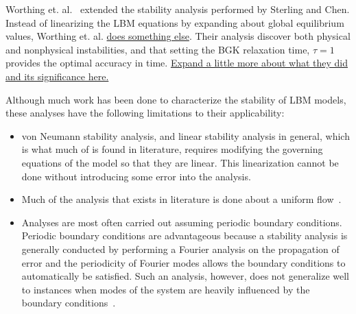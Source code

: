 \documentclass{article}
\begin{document}
Worthing et. al.~\cite{worthing1997stability} extended the stability analysis performed by Sterling and Chen.
Instead of linearizing the LBM equations by expanding about global equilibrium values, Worthing et. al. \ul{does something else}.
Their analysis discover both physical and nonphysical instabilities, and that setting the BGK relaxation time, $\tau = 1$ provides the optimal accuracy in time. %
\ul{Expand a little more about what they did and its significance here.}

Although much work has been done to characterize the stability of LBM models, these analyses have the following limitations to their applicability:

\begin{itemize}
	\item von Neumann stability analysis, and linear stability analysis in general, which is what much of is found in literature, requires modifying the governing equations of the model so that they are linear. %
	This linearization cannot be done without introducing some error into the analysis. %
	\item Much of the analysis that exists in literature is done about a uniform flow~\cite{worthing1997stability,niu2004investigation}. %
	\item Analyses are most often carried out assuming periodic boundary conditions.
	Periodic boundary conditions are advantageous because a stability analysis is generally conducted by performing a Fourier analysis on the propagation of error and the periodicity of Fourier modes allows the boundary conditions to automatically be satisfied.
	Such an analysis, however, does not generalize well to instances when modes of the system are heavily influenced by the boundary conditions~\cite{worthing1997stability}. %
\end{itemize}
\end{document}
